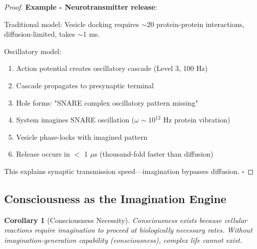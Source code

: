 \documentclass[11pt,a4paper]{article}
\newtheorem{corollary}[theorem]{Corollary}
\begin{document}
\begin{proof}
\textbf{Example - Neurotransmitter release}:

Traditional model: Vesicle docking requires $\sim$20 protein-protein interactions, diffusion-limited, takes $\sim$1 ms.

Oscillatory model: 
\begin{enumerate}
\item Action potential creates oscillatory cascade (Level 3, 100 Hz)
\item Cascade propagates to presynaptic terminal
\item Hole forms: "SNARE complex oscillatory pattern missing"
\item System imagines SNARE oscillation ($\omega \sim 10^{12}$ Hz protein vibration)
\item Vesicle phase-locks with imagined pattern
\item Release occurs in $<$ 1 $\mu$s (thousand-fold faster than diffusion)
\end{enumerate}

This explains synaptic transmission speed—imagination bypasses diffusion. $\square$
\end{proof}

\subsection{Consciousness as the Imagination Engine}

\begin{corollary}[Consciousness Necessity]
Consciousness exists because cellular reactions \textit{require} imagination to proceed at biologically necessary rates. Without imagination-generation capability (consciousness), complex life cannot exist.
\end{corollary}
\end{document}
